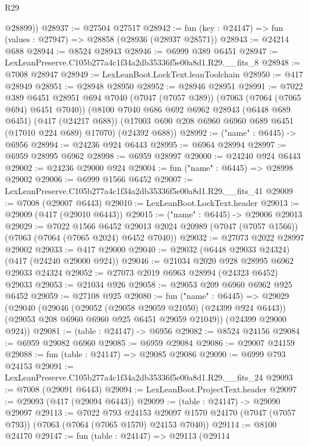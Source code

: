 \begin{lexlean}{R29}
\begin{coremodule}
        @28899))
@28937 := @27504 @27517
@28942 := fun (key : @24147) => fun (values : @27947) => @28858 (@28936 (@28937 @28571))
@28943 := @24214 @688
@28944 := @8524 @28943
@28946 := @6999 @389 @6451
@28947 := LexLeanPreserve.C105b277a4c1f34a2db35336f5e00a8d1.R29.__fits_8
@28948 := @7008 @28947
@28949 := LexLeanBoot.LockText.leanToolchain
@28950 := @417 @28949
@28951 := @28948 @28950
@28952 := @28946 @28951
@28991 := @7022
    @389
    @6451
    @28951
    @694
    @7040
    (@7047 (@7057 @389))
    (@7063 (@7064 (@7065 @694) @6451 @7040))
    (@8100
      @7040
      @686
      @692
      @6962
      @28943
      (@6448 @689 @6451)
      (@417 (@24217 @688))
      (@17003 @690 @208 @6960 @6960 @689 @6451 (@17010 @224 @689) @17070)
      (@24392 @688))
@28992 := ("name" : @6445) -> @6956
@28994 := @24236 @924 @6443
@28995 := @6964 @28994
@28997 := @6959 @28995 @6962
@28998 := @6959 @28997
@29000 := @24240 @924 @6443
@29002 := @24236 @29000 @924
@29004 := fun ("name" : @6445) => @28998 @29002
@29006 := @6999 @1566 @6452
@29007 := LexLeanPreserve.C105b277a4c1f34a2db35336f5e00a8d1.R29.__fits_41
@29009 := @7008 (@29007 @6443)
@29010 := LexLeanBoot.LockText.header
@29013 := @29009 (@417 (@29010 @6443))
@29015 := ("name" : @6445) -> @29006 @29013
@29029 := @7022
    @1566
    @6452
    @29013
    @2024
    @20989
    (@7047 (@7057 @1566))
    (@7063 (@7064 (@7065 @2024) @6452 @7040))
@29032 := @27073 @2022 @28997 @29002
@29033 := @417 @29000
@29040 := @29032 (@6448 @29033 @24324) (@417 (@24240 @29000 @924))
@29046 := @21034 @2020 @928 @28995 @6962 @29033 @24324
@29052 := @27073 @2019 @6963 @28994 (@24323 @6452) @29033
@29053 := @21034 @926
@29058 := @29053 @209 @6960 @6962 @925 @6452
@29059 := @27108 @925
@29080 := fun ("name" : @6445) =>
  @29029
    (@29040
      (@29046
        (@29052 (@29058 @29059 @21050) (@24399 @924 @6443))
        (@29053 @208 @6960 @6960 @925 @6451 @29059 @21049))
      (@24399 @29000 @924))
@29081 := (table : @24147) -> @6956
@29082 := @8524 @24156
@29084 := @6959 @29082 @6960
@29085 := @6959 @29084
@29086 := @29007 @24159
@29088 := fun (table : @24147) => @29085 @29086
@29090 := @6999 @793 @24153
@29091 := LexLeanPreserve.C105b277a4c1f34a2db35336f5e00a8d1.R29.__fits_24
@29093 := @7008 (@29091 @6443)
@29094 := LexLeanBoot.ProjectText.header
@29097 := @29093 (@417 (@29094 @6443))
@29099 := (table : @24147) -> @29090 @29097
@29113 := @7022
    @793
    @24153
    @29097
    @1570
    @24170
    (@7047 (@7057 @793))
    (@7063 (@7064 (@7065 @1570) @24153 @7040))
@29114 := @8100 @24170
@29147 := fun (table : @24147) =>
  @29113
    (@29114

\end{coremodule}
\end{lexlean}
